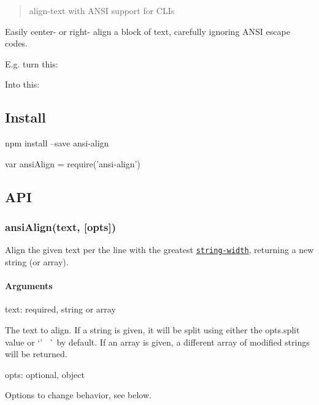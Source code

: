 \begin{quote}
align-\/text with A\+N\+SI support for C\+L\+Is \end{quote}


\href{https://travis-ci.org/nexdrew/ansi-align}{\tt } \href{https://coveralls.io/github/nexdrew/ansi-align?branch=master}{\tt } \href{https://github.com/conventional-changelog/standard-version}{\tt }

Easily center-\/ or right-\/ align a block of text, carefully ignoring A\+N\+SI escape codes.

E.\+g. turn this\+:



Into this\+:



\subsection*{Install}


\begin{DoxyCode}
npm install --save ansi-align
\end{DoxyCode}



\begin{DoxyCode}
var ansiAlign = require('ansi-align')
\end{DoxyCode}


\subsection*{A\+PI}

\subsubsection*{{\ttfamily ansi\+Align(text, \mbox{[}opts\mbox{]})}}

Align the given text per the line with the greatest \href{https://github.com/sindresorhus/string-width}{\tt {\ttfamily string-\/width}}, returning a new string (or array).

\paragraph*{Arguments}


\begin{DoxyItemize}
\item {\ttfamily text}\+: required, string or array

The text to align. If a string is given, it will be split using either the {\ttfamily opts.\+split} value or `'~\newline
\textquotesingle{}\`{} by default. If an array is given, a different array of modified strings will be returned.
\item {\ttfamily opts}\+: optional, object

Options to change behavior, see below.
\end{DoxyItemize}


